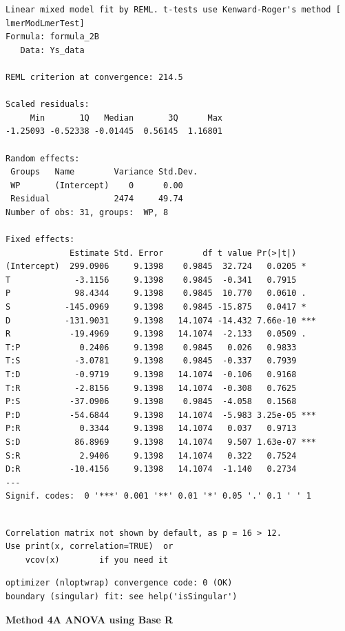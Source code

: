 \documentclass[
  letterpaper,
  DIV=11,
  numbers=noendperiod]{scrartcl}
\begin{document}
\begin{verbatim}
Linear mixed model fit by REML. t-tests use Kenward-Roger's method [
lmerModLmerTest]
Formula: formula_2B
   Data: Ys_data

REML criterion at convergence: 214.5

Scaled residuals: 
     Min       1Q   Median       3Q      Max 
-1.25093 -0.52338 -0.01445  0.56145  1.16801 

Random effects:
 Groups   Name        Variance Std.Dev.
 WP       (Intercept)    0      0.00   
 Residual             2474     49.74   
Number of obs: 31, groups:  WP, 8

Fixed effects:
             Estimate Std. Error        df t value Pr(>|t|)    
(Intercept)  299.0906     9.1398    0.9845  32.724   0.0205 *  
T             -3.1156     9.1398    0.9845  -0.341   0.7915    
P             98.4344     9.1398    0.9845  10.770   0.0610 .  
S           -145.0969     9.1398    0.9845 -15.875   0.0417 *  
D           -131.9031     9.1398   14.1074 -14.432 7.66e-10 ***
R            -19.4969     9.1398   14.1074  -2.133   0.0509 .  
T:P            0.2406     9.1398    0.9845   0.026   0.9833    
T:S           -3.0781     9.1398    0.9845  -0.337   0.7939    
T:D           -0.9719     9.1398   14.1074  -0.106   0.9168    
T:R           -2.8156     9.1398   14.1074  -0.308   0.7625    
P:S          -37.0906     9.1398    0.9845  -4.058   0.1568    
P:D          -54.6844     9.1398   14.1074  -5.983 3.25e-05 ***
P:R            0.3344     9.1398   14.1074   0.037   0.9713    
S:D           86.8969     9.1398   14.1074   9.507 1.63e-07 ***
S:R            2.9406     9.1398   14.1074   0.322   0.7524    
D:R          -10.4156     9.1398   14.1074  -1.140   0.2734    
---
Signif. codes:  0 '***' 0.001 '**' 0.01 '*' 0.05 '.' 0.1 ' ' 1
\end{verbatim}

\begin{verbatim}

Correlation matrix not shown by default, as p = 16 > 12.
Use print(x, correlation=TRUE)  or
    vcov(x)        if you need it
\end{verbatim}

\begin{verbatim}
optimizer (nloptwrap) convergence code: 0 (OK)
boundary (singular) fit: see help('isSingular')
\end{verbatim}

\textbf{Method 4A ANOVA using Base R}
\end{document}
